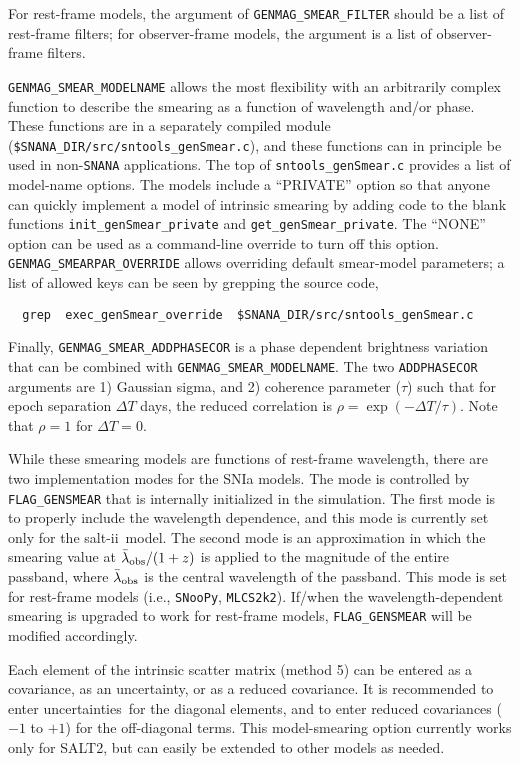 \documentclass[12pt]{article}
\newcommand{\unc}{uncertainty}
\newcommand{\uncs}{uncertainties}
\newcommand{\mlcs}{{\tt MLCS2k2}}
\newcommand{\SALTII}{{\sc salt-ii}}
\newcommand{\snoopy}{{\tt SNooPy}}
\newcommand{\snana}{{\tt SNANA}}
\newcommand{\lamobs}{\lambda_{\rm obs}}
\begin{document}
{For rest-frame models, the argument of {\tt GENMAG\_SMEAR\_FILTER}
should be a list of rest-frame filters; for observer-frame models,
the argument is a list of observer-frame filters.


{\tt GENMAG\_SMEAR\_MODELNAME} allows the most flexibility
with an arbitrarily complex function
to describe the smearing as a function of wavelength and/or phase.
These functions are in a separately compiled module 
({\tt \$SNANA\_DIR/src/sntools\_genSmear.c}), and these 
functions can in principle be used in non-{\snana} applications.
The top of {\tt sntools\_genSmear.c}  
provides a list of model-name options.
The models include a ``PRIVATE'' option so that anyone can 
quickly implement a model of intrinsic smearing by adding 
code to the blank functions 
{\tt init\_genSmear\_private} and {\tt get\_genSmear\_private}.
The ``NONE'' option can be used as a command-line override
to turn off this option.
{\tt GENMAG\_SMEARPAR\_OVERRIDE} allows overriding default 
smear-model parameters; a list of allowed keys can be seen
by grepping the source code,
\begin{verbatim}
  grep  exec_genSmear_override  $SNANA_DIR/src/sntools_genSmear.c
\end{verbatim}
Finally, {\tt GENMAG\_SMEAR\_ADDPHASECOR} is a phase dependent
brightness variation that can be combined with {\tt GENMAG\_SMEAR\_MODELNAME}.
The two {\tt ADDPHASECOR} arguments are 1)  Gaussian sigma, and 2)
coherence parameter ($\tau$) such that for epoch separation 
$\Delta T$ days, the reduced correlation is  
$\rho = \exp(-\Delta T/\tau)$.
Note that $\rho=1$ for $\Delta T = 0$.

While these smearing models are functions of rest-frame
wavelength, there are two implementation modes 
for the SNIa models. The mode is controlled by {\tt FLAG\_GENSMEAR}
that is internally initialized in the simulation.
The first mode is to properly include the wavelength dependence, 
and this mode is currently set only for the \SALTII\ model. 
The second mode is an approximation in which the smearing value at 
$\bar\lamobs/(1+z)$ is applied to the magnitude of the entire passband,
where $\bar\lamobs$ is the central wavelength of the passband.
This mode is set for rest-frame models (i.e., {\snoopy}, {\mlcs}).
If/when the wavelength-dependent smearing is upgraded to work for
rest-frame models, {\tt FLAG\_GENSMEAR} will be modified accordingly.


Each element of the intrinsic scatter matrix (method 5) can be 
entered as a covariance, as an \unc, or as a reduced covariance.
It is recommended to enter \uncs\ for the diagonal elements,
and to enter reduced covariances ($-1$ to $+1$) for the
off-diagonal terms.  This model-smearing option currently
works only for SALT2, but can easily be extended to other
models as needed.


}
\end{document}
